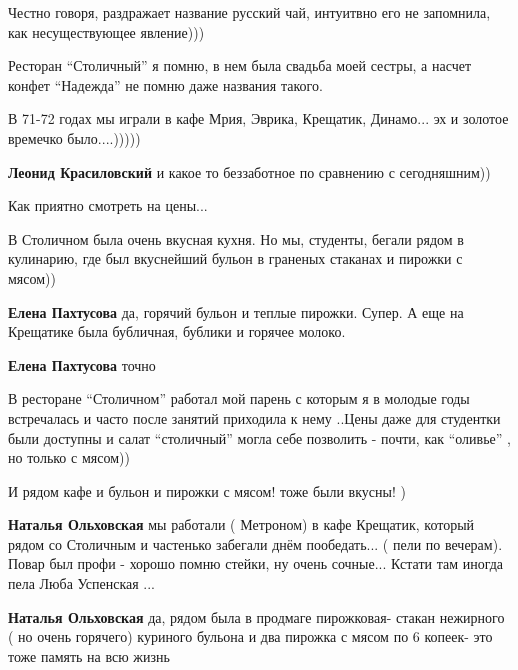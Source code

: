 \begin{itemize}
\begin{itemize}
Честно говоря, раздражает название русский чай, интуитвно его не запомнила, как
несуществующее явление)))

\end{itemize} %


Ресторан \enquote{Столичный} я помню, в нем была свадьба моей сестры, а насчет конфет
\enquote{Надежда} не помню даже названия такого.


В 71-72 годах мы играли в кафе Мрия, Эврика, Крещатик, Динамо... эх и золотое
времечко было....)))))

\textbf{Леонид Красиловский} и какое то беззаботное по сравнению с сегодняшним))

Как приятно смотреть на цены...


В Столичном была очень вкусная кухня. Но мы, студенты, бегали рядом в
кулинарию, где был вкуснейший бульон в граненых стаканах и пирожки с мясом))

\begin{itemize} %
\textbf{Елена Пахтусова} да, горячий бульон и теплые пирожки. Супер. А еще на Крещатике была бубличная, бублики и горячее молоко.

\textbf{Елена Пахтусова} точно
\end{itemize} %


В ресторане \enquote{Столичном} работал мой парень с которым я в молодые годы
встречалась и часто после занятий приходила к нему ..Цены даже для студентки
были доступны и салат \enquote{столичный} могла себе позволить - почти, как \enquote{оливье}
, но только с мясом))

И рядом кафе и бульон и пирожки с мясом! тоже были вкусны! )

\begin{itemize} %
\textbf{Наталья Ольховская} мы работали ( Метроном) в кафе Крещатик, который рядом со Столичным и частенько забегали днём пообедать...
( пели по вечерам). Повар был профи - хорошо помню стейки, ну очень сочные...
Кстати там иногда пела Люба Успенская ...

\textbf{Наталья Ольховская} да, рядом была в продмаге пирожковая- стакан нежирного ( но очень горячего) куриного бульона и два пирожка с мясом по 6 копеек- это тоже память на всю жизнь
\end{itemize} %


\end{itemize}

